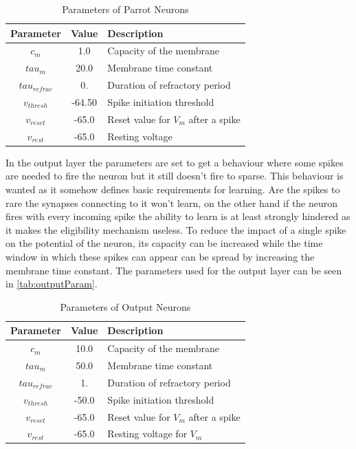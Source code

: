 \begin{table}[htpb]
\caption[Parameters Parrot Neuron]{Parameters of Parrot Neurons} \label{tab:parrotPar}
\centering
\begin{tabular}{|c| c |l|}
    \toprule
    Parameter & Value & Description \\
    \midrule
    $c_m$   & 1.0  & Capacity of the membrane \\
    $tau_{m}$    & 20.0  & Membrane time constant \\
    $tau_{refrac}$   & 0.  & Duration of refractory period\\
    $v_{thresh}$   & -64.50  & Spike initiation threshold \\
    $v_{reset}$    & -65.0  &  Reset value for $V_m$ after a spike \\
		$v_{rest}$ & -65.0 & Resting voltage \\
    \bottomrule
\end{tabular}
\end{table}

In the output layer the parameters are set to get a behaviour where some spikes are needed to fire the neuron but it still doesn’t fire to sparse. This behaviour is wanted as it somehow defines basic requirements for learning. Are the spikes to rare the synapses connecting to it won’t learn, on the other hand if the neuron fires with every incoming spike the ability to learn is at least strongly hindered as it makes the eligibility mechanism useless. To reduce the impact of a single spike on the potential of the neuron, its capacity can be increased while the time window in which these spikes can appear can be spread by increasing the membrane time constant. The parameters used for the output layer can be seen in \autoref{tab:outputParam}.


\begin{table}[htpb]
  \caption[Parameters Output Neuron]{Parameters of Output Neurons} \label{tab:outputParam}
  \centering
  \begin{tabular}{|c| c |l|}
      \toprule
      Parameter & Value & Description \\
      \midrule
      $c_m$   & 10.0  & Capacity of the membrane \\
      $tau_{m}$    & 50.0  & Membrane time constant \\
      $tau_{refrac}$   & 1.  & Duration of refractory period\\
      $v_{thresh}$   & -50.0  & Spike initiation threshold \\
      $v_{reset}$    & -65.0  &  Reset value for $V_m$ after a spike \\
      $v_{rest}$ & -65.0 & Resting voltage for $V_m$ \\
      \bottomrule
  \end{tabular}
  \end{table}


